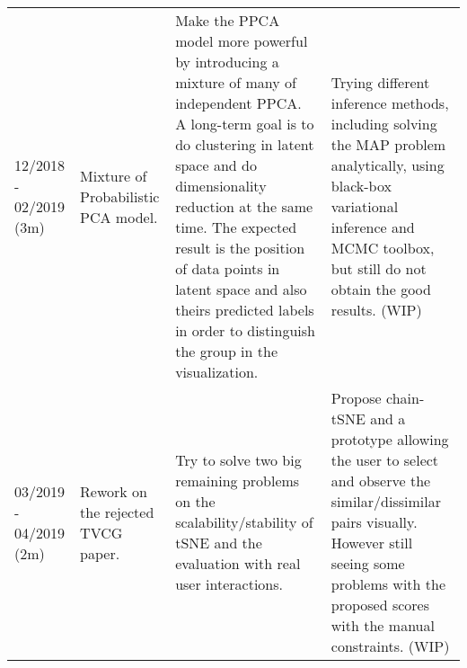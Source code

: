 \documentclass[11pt, a4paper]{article}
\begin{document}
{\begin{landscape}
\begin{longtable}{p{.07\linewidth}|p{.16\linewidth}|p{.40\linewidth}|p{.30\linewidth}}
            12/2018 - 02/2019 (3m) & Mixture of Probabilistic PCA model. & Make the PPCA model more powerful by introducing a mixture of many of independent PPCA. A long-term goal is to do clustering in latent space and do dimensionality reduction at the same time. The expected result is the position of data points in latent space and also theirs predicted labels in order to distinguish the group in the visualization. & Trying different inference methods, including solving the MAP problem analytically, using black-box variational inference and MCMC toolbox, but still do not obtain the good results. (WIP) \\
            
            03/2019 - 04/2019 (2m) & Rework on the rejected TVCG paper. & Try to solve two big remaining problems on the scalability/stability of tSNE and the evaluation with real user interactions. & Propose chain-tSNE and a prototype allowing the user to select and observe the similar/dissimilar pairs visually. However still seeing some problems with the proposed scores with the manual constraints. (WIP) \\
        \end{longtable}


    \end{landscape}
    \clearpage%
} %
\end{document}
